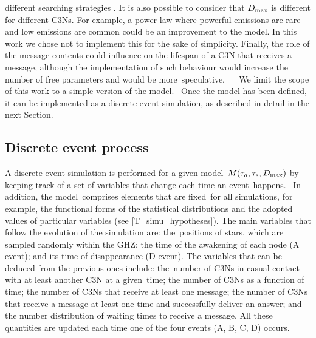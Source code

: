 \documentclass[crop]{CSLB}
\newcommand{\ceti}{C3N}
\newcommand{\cetis}{C3Ns}
\begin{document}
different searching strategies \citep{hippke_interstellar_2017}. 
%
It is also possible to consider that $D_{\rm max}$ is different for different
\cetis{}.
%
For example, a power law where powerful emissions are rare and low emissions
are common could be an improvement to the model.
%
In this work we chose not to implement this for the sake of simplicity.
%
Finally, the role of the message contents could influence on the lifespan of a
\ceti{} that receives a message, although the implementation of such behaviour
would increase the number of free parameters and would be more speculative.   
%
We limit the scope of this work to a simple version of the model. 
%
Once the model has been defined, it can be implemented as a discrete event
simulation, as described in detail in the next Section.


\subsection{Discrete event process}

A discrete event simulation is performed for a given model $M(\tau_a, \tau_s,
D_{\rm max})$ by keeping track of a set of variables that change each time an
event happens. 
%
In addition, the model comprises elements that are fixed for all simulations,
for example, the functional forms of the statistical distributions and the
adopted values of particular variables (see \ref{T_simu_hypotheses}).
%
The main variables that follow the evolution of the simulation are:
the positions of stars, which are sampled randomly within the GHZ; the time of
the awakening of each node (A event); and its time of disappearance (D event).
%
The variables that can be deduced from the previous ones include: the number of
\cetis{} in casual contact with at least another \ceti{} at a given time; the
number of \cetis{} as a function of time; the number of \cetis{} that receive at
least one message; the number of \cetis{} that receive a message at
least one time and successfully deliver an answer; and the number distribution
of waiting times to receive a message.
%
All these quantities are updated each time one of the four events (A, B, C, D)
occurs.   


           
\end{document}
